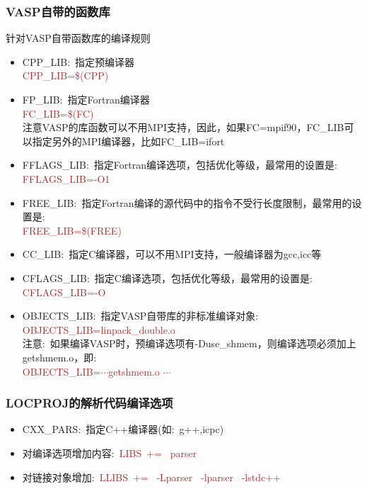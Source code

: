 \subsubsection{\rm{VASP}自带的函数库}
针对\textrm{VASP}自带函数库的编译规则
\begin{itemize}
	\item \textrm{CPP\_LIB}:~指定预编译器\\
		\textcolor{brown}{\textrm{CPP\_LIB=\$(CPP)}}
	\item \textrm{FP\_LIB}:~指定\textrm{Fortran}编译器\\
		\textcolor{brown}{\textrm{FC\_LIB=\$(FC)}}\\
		注意\textrm{VASP}的库函数可以不用\textrm{MPI}支持，因此，如果\textrm{FC=mpif90}，\textrm{FC\_LIB}可以指定另外的\textrm{MPI}编译器，比如\textrm{FC\_LIB=ifort}
	\item \textrm{FFLAGS\_LIB}:~指定\textrm{Fortran}编译选项，包括优化等级，最常用的设置是:\\
		\textcolor{brown}{\textrm{FFLAGS\_LIB=-O1}}
	\item \textrm{FREE\_LIB}:~指定\textrm{Fortran}编译的源代码中的指令不受行长度限制，最常用的设置是:\\
		\textcolor{brown}{\textrm{FREE\_LIB=\$(FREE)}}
	\item \textrm{CC\_LIB}:~指定\textrm{C}编译器，可以不用\textrm{MPI}支持，一般编译器为\textrm{gcc,icc}等
	\item \textrm{CFLAGS\_LIB}:~指定\textrm{C}编译选项，包括优化等级，最常用的设置是:\\
		\textcolor{brown}{\textrm{CFLAGS\_LIB=-O}}
	\item \textrm{OBJECTS\_LIB}:~指定\textrm{VASP}自带库的非标准编译对象:\\
		\textcolor{brown}{\textrm{OBJECTS\_LIB=linpack\_double.o}}\\
		注意:~如果编译\textrm{VASP}时，预编译选项有\textrm{-Duse\_shmem}，则编译选项必须加上\textrm{getshmem.o}，即:\\
		\textcolor{brown}{\textrm{OBJECTS\_LIB=$\cdots$getshmem.o $\cdots$}}
\end{itemize}
\subsubsection{\rm{LOCPROJ}的解析代码编译选项}
\begin{itemize}
	\item \textrm{CXX\_PARS}:~指定\textrm{C++}编译器(如:~\textrm{g++,icpc})
	\item 对编译选项增加内容:~\textcolor{brown}{\textrm{LIBS~+=~ parser}}
	\item 对链接对象增加:~\textcolor{brown}{\textrm{LLIBS~+=~ -Lparser ~-lparser ~-lstdc++}}
\end{itemize}

